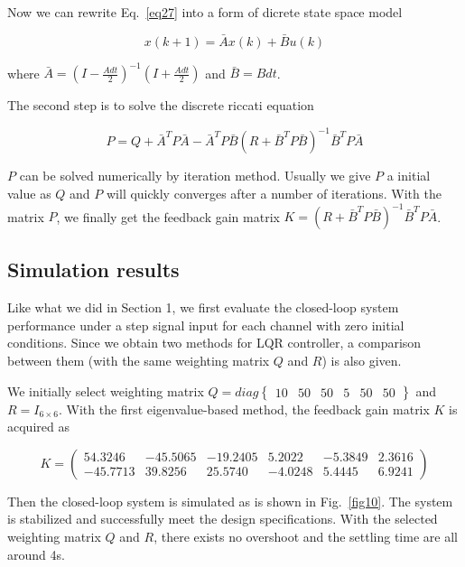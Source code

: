 \documentclass[hyperref]{article}
\theoremstyle{nonumberplain}
\begin{document}
	Now we can rewrite Eq.~\ref{eq27} into a form of dicrete state space model
	
	\begin{equation}
	x(k+1)=\bar{A}x(k)+\bar{B}u(k)
	\label{eq28}
	\end{equation}
	
	where $\bar{A}=(I-\frac{Adt}{2})^{-1}(I+\frac{Adt}{2})$ and $\bar{B}=Bdt$.
	
	The second step is to solve the discrete riccati equation
	
	\begin{equation}
	P=Q+\bar{A}^{T}P\bar{A}-\bar{A}^{T}P\bar{B}(R+\bar{B}^{T}P\bar{B})^{-1}\bar{B}^{T}P\bar{A}
	\label{eq29}
	\end{equation}
	
	$P$ can be solved numerically by iteration method. Usually we give $P$ a initial value as $Q$ and $P$ will quickly converges after a number of iterations. With the matrix $P$, we finally get the feedback gain matrix $K=(R+\bar{B}^{T}P\bar{B})^{-1}\bar{B}^{T}P\bar{A}$.
	
	
	\subsection{Simulation results}
	
	\hspace{1.0em}
	Like what we did in Section 1, we first evaluate the closed-loop system performance under a step signal input for each channel with zero initial conditions. Since we obtain two methods for LQR controller, a comparison between them (with the same weighting matrix $Q$ and $R$) is also given.
	
	We initially select weighting matrix $Q=diag\begin{Bmatrix}
	10 &50  &50  &5  &50  &50 
	\end{Bmatrix}$ and $R=I_{6\times 6}$. With the first eigenvalue-based method, the feedback gain matrix $K$ is acquired as
	
	\begin{equation}
	K=\begin{pmatrix}
	54.3246 &-45.5065  &-19.2405  &5.2022  &-5.3849  &2.3616 \\ 
	-45.7713 &39.8256  &25.5740  &-4.0248  &5.4445  &6.9241 
	\end{pmatrix}
	\nonumber
	\end{equation}
	
	Then the closed-loop system is simulated as is shown in Fig.~\ref{fig10}. The system is stabilized and successfully meet the design specifications. With the selected weighting matrix $Q$ and $R$, there exists no overshoot and the settling time are all around 4s.
		
\end{document}
